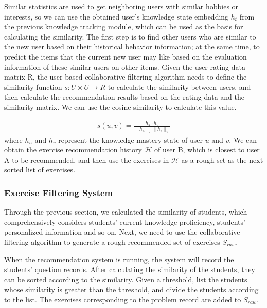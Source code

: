 Similar statistics are used to get neighboring users with similar hobbies or interests, so we can use the obtained user's knowledge state embedding \(h_t\) from the previous knowledge tracking module, which can be used as the basis for calculating the similarity. The first step is to find other users who are similar to the new user based on their historical behavior information; at the same time, to predict the items that the current new user may like based on the evaluation information of these similar users on other items. Given the user rating data matrix R, the user-based collaborative filtering algorithm needs to define the similarity function \(s : U \times U \to R\) to calculate the similarity between users, and then calculate the recommendation results based on the rating data and the similarity matrix. We can use the cosine similarity to calculate this value.

\begin{align}
  s(u, v)=\frac{h_{u} \cdot h_{v}}{\|h_{u}\|_{2}\|h_{v}\|_{2}}
\end{align}
where \(h_u\) and \(h_v\) represent the knowledge mastery state of user \(u\) and \(v\).
We can obtain the exercise recommendation history \(\mathcal{H}\) of user B, which is closest to user A to be recommended, and then use the exercises in \(\mathcal{H}\) as a rough set as the next sorted list of exercises.

\subsubsection{Exercise Filtering System}
Through the previous section, we calculated the similarity of students, which comprehensively considers students' current knowledge proficiency, students' personalized information and so on. Next, we need to use the collaborative filtering algorithm to generate a rough recommended set of exercises \(S_{raw}\).

When the recommendation system is running, the system will record the students' question records. After calculating the similarity of the students, they can be sorted according to the similarity. Given a threshold, list the students whose similarity is greater than the threshold, and divide the students according to the list. The exercises corresponding to the problem record are added to \(S_{raw}\).

